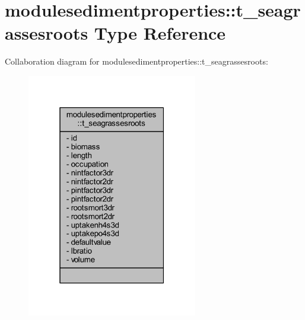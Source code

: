 \hypertarget{structmodulesedimentproperties_1_1t__seagrassesroots}{}\section{modulesedimentproperties\+:\+:t\+\_\+seagrassesroots Type Reference}
\label{structmodulesedimentproperties_1_1t__seagrassesroots}


Collaboration diagram for modulesedimentproperties\+:\+:t\+\_\+seagrassesroots\+:\nopagebreak
\begin{figure}[H]
\begin{center}
\leavevmode
\includegraphics[width=211pt]{structmodulesedimentproperties_1_1t__seagrassesroots__coll__graph}
\end{center}
\end{figure}
